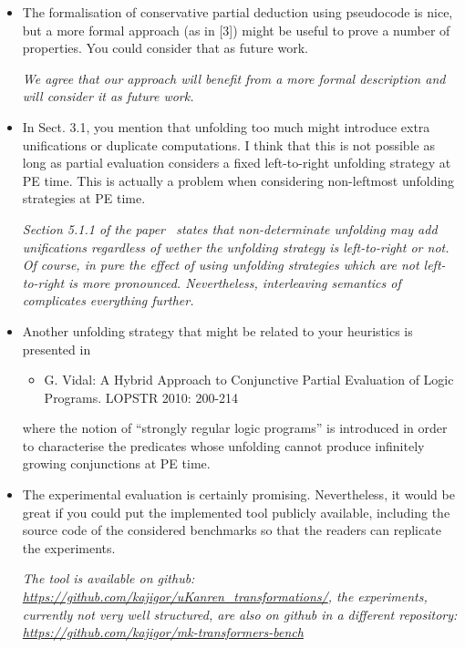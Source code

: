 \begin{itemize}
  \item The formalisation of conservative partial deduction using pseudocode is nice, but a more formal approach (as in [3]) might be useful to prove a number of properties. You could consider that as future work.

  \emph{We agree that our approach will benefit from a more formal description and will consider it as future work.}

  \item{In Sect. 3.1, you mention that unfolding too much might introduce extra unifications or duplicate computations. I think that this is not possible as long as partial evaluation considers a fixed left-to-right unfolding strategy at PE time. This is actually a problem when considering non-leftmost unfolding strategies at PE time.}

  \emph{Section 5.1.1 of the paper~\cite{de1999conjunctive} states that non-determinate unfolding may add unifications regardless of wether the unfolding strategy is left-to-right or not. Of course, in pure \pro the effect of using unfolding strategies which are not left-to-right is more pronounced. Nevertheless, interleaving semantics of \mk complicates everything further.}

  \item Another unfolding strategy that might be related to your heuristics
  is presented in

  \begin{itemize}
    \item G. Vidal: A Hybrid Approach to Conjunctive Partial Evaluation of Logic
    Programs. LOPSTR 2010: 200-214
  \end{itemize}

  where the notion of ``strongly regular logic programs'' is introduced in order to characterise the predicates whose unfolding cannot produce infinitely growing conjunctions at PE time.


  \item {The experimental evaluation is certainly promising. Nevertheless,
  it would be great if you could put the implemented tool publicly available,
  including the source code of the considered benchmarks so that the readers
  can replicate the experiments.}

  \emph{The tool is available on github: \url{https://github.com/kajigor/uKanren_transformations/}, the experiments, currently not very well structured, are also on github in a different repository: \url{https://github.com/kajigor/mk-transformers-bench}}
\end{itemize}



